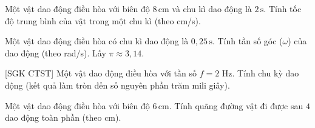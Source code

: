 \begin{ex}
Một vật dao động điều hòa với biên độ $8\,\text{cm}$ và chu kì dao động là $2\,\text{s}$. Tính tốc độ trung bình của vật trong một chu kì (theo cm/s).
\end{ex}

\begin{ex}
Một vật dao động điều hòa có chu kì dao động là $0,25\,\text{s}$. Tính tần số góc ($\omega$) của dao động (theo rad/s). Lấy $\pi \approx 3,14$.
\end{ex}

\begin{ex}
[SGK CTST]
	Một vật dao động điều hòa với tần số $f=2$ Hz. Tính chu kỳ dao động (kết quả làm tròn đến số nguyên phần trăm mili giây).
\end{ex}

\begin{ex}
Một vật dao động điều hòa với biên độ $6\,\text{cm}$. Tính quãng đường vật đi được sau $4$ dao động toàn phần (theo cm).
\end{ex}

